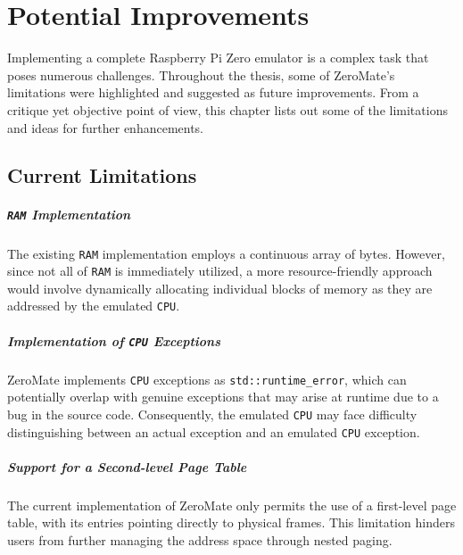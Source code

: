 \documentclass[english, ing, kiv, he, iso690numb, pdf]{fasthesis}
\begin{document}
	\chapter{Potential Improvements}
	
	Implementing a complete Raspberry Pi Zero emulator is a complex task that poses numerous challenges. Throughout the thesis, some of ZeroMate's limitations were highlighted and suggested as future improvements. From a critique yet objective point of view, this chapter lists out some of the limitations and ideas for further enhancements.
	
	\section{Current Limitations} \label{section-Current-Limitations}
	
	\paragraph{\texttt{RAM} Implementation}
	
	The existing \texttt{RAM} implementation employs a continuous array of bytes. However, since not all of \texttt{RAM} is immediately utilized, a more resource-friendly approach would involve dynamically allocating individual blocks of memory as they are addressed by the emulated \texttt{CPU}.
	
	\paragraph{Implementation of \texttt{CPU} Exceptions}
	
	ZeroMate implements \texttt{CPU} exceptions as \texttt{std::runtime\_error}, which can potentially overlap with genuine exceptions that may arise at runtime due to a bug in the source code. Consequently, the emulated \texttt{CPU} may face difficulty distinguishing between an actual exception and an emulated \texttt{CPU} exception.
	
	\paragraph{Support for a Second-level Page Table}
	
	The current implementation of ZeroMate only permits the use of a first-level page table, with its entries pointing directly to physical frames. This limitation hinders users from further managing the address space through nested paging.
	
\end{document}

